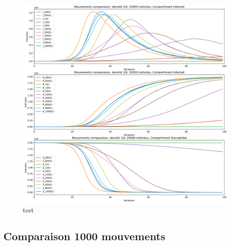 \begin{figure}[h]
	\centering
	\captionsetup{justification=centering}
	\includegraphics[width=.7\textwidth]{Images/SIR_mouvements_variables.png}
	\caption{test}
\end{figure}

\subsection{Comparaison 1000 mouvements}


